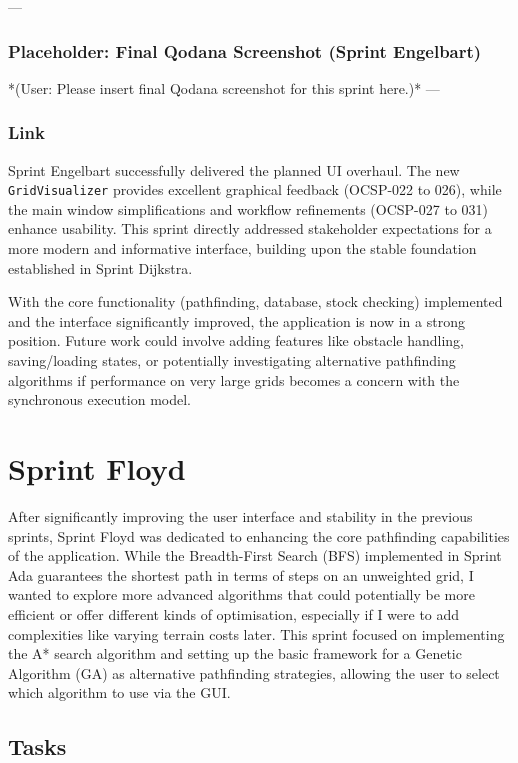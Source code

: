 --- %
\subsubsection*{Placeholder: Final Qodana Screenshot (Sprint Engelbart)}
*(User: Please insert final Qodana screenshot for this sprint here.)*
---

\subsubsection{Link}
Sprint Engelbart successfully delivered the planned UI overhaul. The new \verb|GridVisualizer| provides excellent graphical feedback (OCSP-022 to 026), while the main window simplifications and workflow refinements (OCSP-027 to 031) enhance usability. This sprint directly addressed stakeholder expectations for a more modern and informative interface, building upon the stable foundation established in Sprint Dijkstra.

With the core functionality (pathfinding, database, stock checking) implemented and the interface significantly improved, the application is now in a strong position. Future work could involve adding features like obstacle handling, saving/loading states, or potentially investigating alternative pathfinding algorithms if performance on very large grids becomes a concern with the synchronous execution model.


\newpage

\section{Sprint Floyd}

After significantly improving the user interface and stability in the previous sprints, Sprint Floyd was dedicated to enhancing the core pathfinding capabilities of the application. While the Breadth-First Search (BFS) implemented in Sprint Ada guarantees the shortest path in terms of steps on an unweighted grid, I wanted to explore more advanced algorithms that could potentially be more efficient or offer different kinds of optimisation, especially if I were to add complexities like varying terrain costs later. This sprint focused on implementing the A* search algorithm and setting up the basic framework for a Genetic Algorithm (GA) as alternative pathfinding strategies, allowing the user to select which algorithm to use via the GUI.

\subsection{Tasks}

